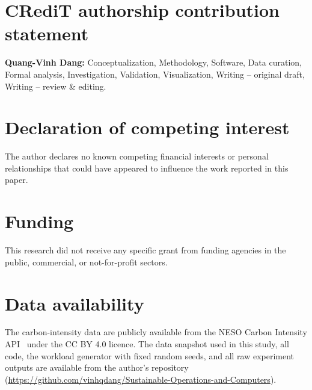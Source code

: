 \documentclass[preprint,12pt]{elsarticle}
\begin{document}
\linenumbers







\section*{CRediT authorship contribution statement}
\textbf{Quang-Vinh Dang:} Conceptualization, Methodology, Software, Data curation, Formal analysis, Investigation, Validation, Visualization, Writing -- original draft, Writing -- review \& editing.

\section*{Declaration of competing interest}
The author declares no known competing financial interests or personal relationships that could have appeared to influence the work reported in this paper.

\section*{Funding}
This research did not receive any specific grant from funding agencies in the public, commercial, or not-for-profit sectors.

\section*{Data availability}
The carbon-intensity data are publicly available from the NESO Carbon Intensity API~\cite{nesoapi} under the CC BY 4.0 licence. The data snapshot used in this study, all code, the workload generator with fixed random seeds, and all raw experiment outputs are available from the author's repository (\url{https://github.com/vinhqdang/Sustainable-Operations-and-Computers}).

\appendix
\setcounter{figure}{0}\setcounter{table}{0}
\makeatletter{}\makeatother
\renewcommand{\thefigure}{\Alph{section}.\arabic{figure}}
\renewcommand{\thetable}{\Alph{section}.\arabic{table}}






\end{document}
